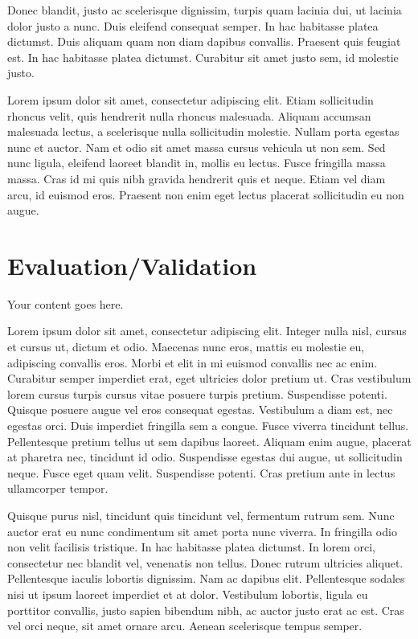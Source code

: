 \documentclass[12pt,lot,lof]{quthesis}
\begin{document}
Donec blandit, justo ac scelerisque dignissim, turpis quam lacinia dui, ut lacinia dolor justo a nunc. Duis eleifend consequat semper. In hac habitasse platea dictumst. Duis aliquam quam non diam dapibus convallis. Praesent quis feugiat est. In hac habitasse platea dictumst. Curabitur sit amet justo sem, id molestie justo.

Lorem ipsum dolor sit amet, consectetur adipiscing elit. Etiam sollicitudin rhoncus velit, quis hendrerit nulla rhoncus malesuada. Aliquam accumsan malesuada lectus, a scelerisque nulla sollicitudin molestie. Nullam porta egestas nunc et auctor. Nam et odio sit amet massa cursus vehicula ut non sem. Sed nunc ligula, eleifend laoreet blandit in, mollis eu lectus. Fusce fringilla massa massa. Cras id mi quis nibh gravida hendrerit quis et neque. Etiam vel diam arcu, id euismod eros. Praesent non enim eget lectus placerat sollicitudin eu non augue.

\chapter{Evaluation/Validation}
Your content goes here.

Lorem ipsum dolor sit amet, consectetur adipiscing elit. Integer nulla nisl, cursus et cursus ut, dictum et odio. Maecenas nunc eros, mattis eu molestie eu, adipiscing convallis eros. Morbi et elit in mi euismod convallis nec ac enim. Curabitur semper imperdiet erat, eget ultricies dolor pretium ut. Cras vestibulum lorem cursus turpis cursus vitae posuere turpis pretium. Suspendisse potenti. Quisque posuere augue vel eros consequat egestas. Vestibulum a diam est, nec egestas orci. Duis imperdiet fringilla sem a congue. Fusce viverra tincidunt tellus. Pellentesque pretium tellus ut sem dapibus laoreet. Aliquam enim augue, placerat at pharetra nec, tincidunt id odio. Suspendisse egestas dui augue, ut sollicitudin neque. Fusce eget quam velit. Suspendisse potenti. Cras pretium ante in lectus ullamcorper tempor.

Quisque purus nisl, tincidunt quis tincidunt vel, fermentum rutrum sem. Nunc auctor erat eu nunc condimentum sit amet porta nunc viverra. In fringilla odio non velit facilisis tristique. In hac habitasse platea dictumst. In lorem orci, consectetur nec blandit vel, venenatis non tellus. Donec rutrum ultricies aliquet. Pellentesque iaculis lobortis dignissim. Nam ac dapibus elit. Pellentesque sodales nisi ut ipsum laoreet imperdiet et at dolor. Vestibulum lobortis, ligula eu porttitor convallis, justo sapien bibendum nibh, ac auctor justo erat ac est. Cras vel orci neque, sit amet ornare arcu. Aenean scelerisque tempus semper.
\end{document}
